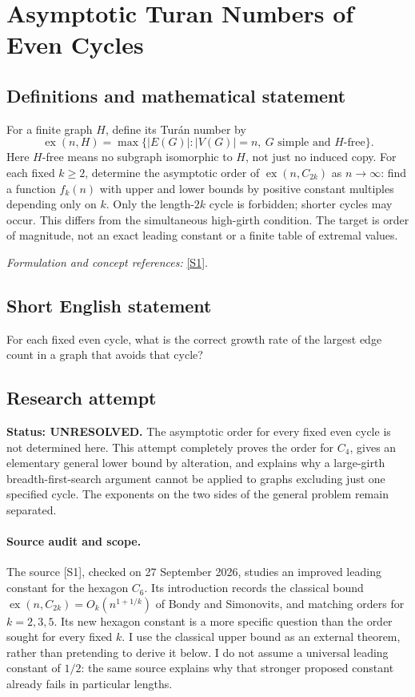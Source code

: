 \documentclass[11pt]{article}
\begin{document}
\section*{\texorpdfstring{Asymptotic Turan Numbers of Even Cycles}{Asymptotic Turan Numbers of Even Cycles}}\label{30006885}
\subsection{Definitions and mathematical statement}
For a finite graph $H$, define its Tur\'an number by
\[
 \operatorname{ex}(n,H)=\max\{|E(G)|:|V(G)|=n,\ G\text{ simple and }H\text{-free}\}.
\]
Here $H$-free means no subgraph isomorphic to $H$, not just no induced copy. For each fixed $k\ge2$, determine the asymptotic order of $\operatorname{ex}(n,C_{2k})$ as $n\to\infty$: find a function $f_k(n)$ with upper and lower bounds by positive constant multiples depending only on $k$. Only the length-$2k$ cycle is forbidden; shorter cycles may occur. This differs from the simultaneous high-girth condition. The target is order of magnitude, not an exact leading constant or a finite table of extremal values.
\par\smallskip\textit{Formulation and concept references:} \href{https://arxiv.org/html/2609.10003}{[S1]}.

\subsection{Short English statement}
For each fixed even cycle, what is the correct growth rate of the largest edge count in a graph that avoids that cycle?
\subsection{Research attempt}
\textbf{Status: UNRESOLVED.} The asymptotic order for every fixed even cycle is not determined here. This attempt completely proves the order for $C_4$, gives an elementary general lower bound by alteration, and explains why a large-girth breadth-first-search argument cannot be applied to graphs excluding just one specified cycle. The exponents on the two sides of the general problem remain separated.

\paragraph{Source audit and scope.}
The source [S1], checked on 27 September 2026, studies an improved leading constant for the hexagon $C_6$. Its introduction records the classical bound $\operatorname{ex}(n,C_{2k})=O_k(n^{1+1/k})$ of Bondy and Simonovits, and matching orders for $k=2,3,5$. Its new hexagon constant is a more specific question than the order sought for every fixed $k$. I use the classical upper bound as an external theorem, rather than pretending to derive it below. I do not assume a universal leading constant of $1/2$: the same source explains why that stronger proposed constant already fails in particular lengths.
\end{document}
